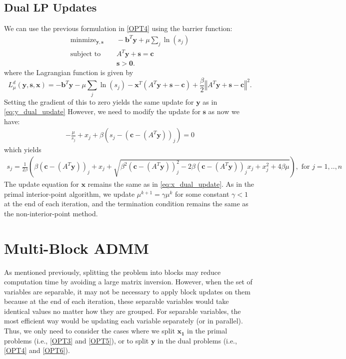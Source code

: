 \documentclass{article}
\begin{document}
\subsection*{Dual LP Updates}
We can use the previous formulation in \eqref{OPT4} using the barrier function:
\begin{align}
\text{minmize}_{\mathbf{y}, \mathbf{s}} &\quad -\mathbf{b}^T\mathbf{y} + \mu \sum_j \ln (s_j)  \tag{OPT6}\label{OPT6} \\
\text{subject to } &\quad  A^T \mathbf{y}  + \mathbf{s} = \mathbf{c}  \nonumber \\
&\quad \mathbf{s} > \mathbf{0} \nonumber.
\end{align}
where the Lagrangian function is given by
\[
L_{\mu}^{d}(\mathbf{y},\mathbf{s},\mathbf{x})=-\mathbf{b}^{T}\mathbf{y}-\mu\sum_{j}\ln\left(s_{j}\right)-\mathbf{x}^{T}\left(A^{T}\mathbf{y}+\mathbf{s}-\mathbf{c}\right)+\frac{\beta}{2}\left\Vert A^{T}\mathbf{y}+\mathbf{s}-\mathbf{c}\right\Vert ^{2}.
\]
Setting the gradient of this to zero yields the same update for $\mathbf{y}$ as in \eqref{eq:y_dual_update} 
However, we need to modify the update for $\mathbf{s}$ as now we have:
\begin{align}
- \frac{\mu}{s_j} + x_j  + \beta \left(s_j - (\mathbf{c} - (A^T \mathbf{y}))_j\right)= 0
\end{align}
which yields 
\begin{align}
s_j = \frac{1}{2\beta}\left(\beta (\mathbf{c} - (A^T \mathbf{y}))_j + x_j  + \sqrt{\beta^2 (\mathbf{c} - (A^T \mathbf{y}))_j^2 - 2\beta (\mathbf{c} - (A^T \mathbf{y}))_j x_{j} + x_j^2 + 4\beta\mu } \right), \text{ for $j = 1,..,n$}
\end{align}
The update equation for $\mathbf{x}$ remains the same as in \eqref{eq:x_dual_update}. As in the primal interior-point algorithm, we update $\mu^{k+1} = \gamma \mu^k$ for some constant $\gamma<1$ at the end of each iteration, and the termination condition remains the same as the non-interior-point method.



\vspace{0.5in}
\section{Multi-Block ADMM}

As mentioned previously, splitting the problem into blocks may reduce computation time by avoiding a large matrix inversion.
However, when the set of variables are separable, it may not be necessary to apply block updates on them because at the end of each iteration, these separable variables would take identical values no matter how they are grouped. For separable variables, the most efficient way would be updating each variable separately (or in parallel). Thus, we only need to consider the cases where we split $\mathbf{x_1}$ in the primal problems (i.e.,  \eqref{OPT3} and \eqref{OPT5}), or to split $\mathbf{y}$ in the dual problems (i.e.,  \eqref{OPT4} and \eqref{OPT6}).
\end{document}
